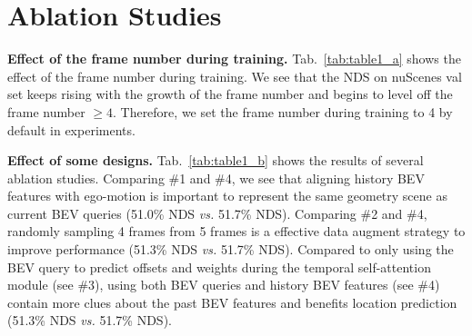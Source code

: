 \documentclass{article}
\begin{document}
\section{Ablation Studies}

\noindent\textbf{Effect of the frame number during training.} Tab.~\ref{tab:table1_a} shows the effect of the frame number during training. We see that the NDS on nuScenes val set keeps
rising with the growth of the frame number and begins to level off the frame number $\ge 4$. Therefore, we set the frame number during training to 4 by default in experiments.



\noindent\textbf{Effect of some designs.} Tab.~\ref{tab:table1_b} shows the results of several ablation studies. Comparing \#1 and \#4, we see that aligning history BEV features with ego-motion is important to represent the same geometry scene as current BEV queries (51.0\% NDS \emph{vs.} 51.7\% NDS). Comparing \#2 and \#4, randomly sampling 4 frames from 5 frames is a effective data augment strategy to improve performance (51.3\% NDS \emph{vs.} 51.7\% NDS). Compared to only using the BEV query to predict offsets and weights during the temporal self-attention module (see \#3), using both BEV queries and history BEV features (see \#4) contain more clues about the past BEV features and benefits location prediction (51.3\% NDS \emph{vs.} 51.7\% NDS).
\end{document}
